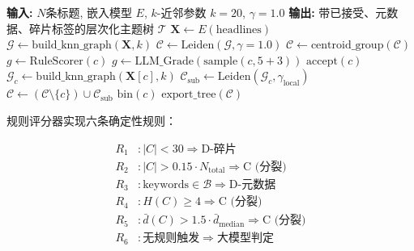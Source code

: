 \documentclass[10pt,twocolumn,twoside]{ctexart}
\begin{document}
\begin{algorithm}[h]
\caption{层次化新闻主题编目流水线}
\label{alg:pipeline}
\small
\begin{algorithmic}[1]
\State \textbf{输入:} $N$条标题, 嵌入模型 $E$, $k$-近邻参数 $k=20$, $\gamma=1.0$
\State \textbf{输出:} 带已接受、元数据、碎片标签的层次化主题树 $\mathcal{T}$
\State
\State $\mathbf{X} \gets E(\text{headlines})$ 
\State $\mathcal{G} \gets \text{build\_knn\_graph}(\mathbf{X}, k)$ 
\State $\mathcal{C} \gets \text{Leiden}(\mathcal{G}, \gamma=1.0)$ 
\State $\mathcal{C} \gets \text{centroid\_group}(\mathcal{C})$ 
\State
{}
        \State $g \gets \text{RuleScorer}(c)$ 
            \State $g \gets \text{LLM\_Grade}(\text{sample}(c, 5+3))$ 
        \EndIf
            \State $\text{accept}(c)$
            \State $\mathcal{G}_c \gets \text{build\_knn\_graph}(\mathbf{X}[c], k)$ 
            \State $\mathcal{C}_{\text{sub}} \gets \text{Leiden}(\mathcal{G}_c, \gamma_{\text{local}})$
            \State $\mathcal{C} \gets (\mathcal{C} \setminus \{c\}) \cup \mathcal{C}_{\text{sub}}$ 
            \State $\text{bin}(c)$ 
        \EndIf
    \EndFor
\EndWhile
\State \Return $\text{export\_tree}(\mathcal{C})$
\end{algorithmic}
\end{algorithm}

规则评分器实现六条确定性规则：

\begin{align}
R_1 &: |C| < 30 \Rightarrow \text{D-碎片} \label{eq:r1} \\
R_2 &: |C| > 0.15 \cdot N_{\text{total}} \Rightarrow \text{C (分裂)} \label{eq:r2} \\
R_3 &: \text{keywords} \in \mathcal{B} \Rightarrow \text{D-元数据} \label{eq:r3} \\
R_4 &: H(C) \geq 4 \Rightarrow \text{C (分裂)} \label{eq:r4} \\
R_5 &: \bar{d}(C) > 1.5 \cdot \bar{d}_{\text{median}} \Rightarrow \text{C (分裂)} \label{eq:r5} \\
R_6 &: \text{无规则触发} \Rightarrow \text{大模型判定} \label{eq:r6}
\end{align}
\end{document}
